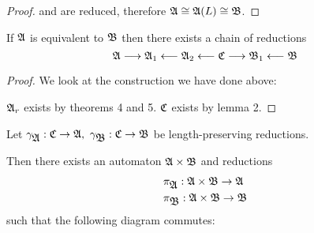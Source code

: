 \begin{proof}
 and  are reduced, therefore $\mbox{$\mathfrak{A}$} \cong \mbox{$\mathfrak{A}$}(L) \cong \mbox{$\mathfrak{B}$}$.
\end{proof}

\medskip
\begin{corollary}
If $\mbox{$\mathfrak{A}$}$ is equivalent to $\mbox{$\mathfrak{B}$}$ then there exists a chain of reductions
\[ \mbox{$\mathfrak{A}$} \longrightarrow \mbox{$\mathfrak{A}$}_1 \longleftarrow \mbox{$\mathfrak{A}$}_2 \longleftarrow \mbox{$\mathfrak{C}$}
\longrightarrow \mbox{$\mathfrak{B}$}_1 \longleftarrow \mbox{$\mathfrak{B}$} \]
\end{corollary}

\begin{proof}
We look at the construction we have done above:

\begin{center}
\end{center}

$\mbox{$\mathfrak{A}$}_r$ exists by theorems 4 and 5. $\mbox{$\mathfrak{C}$}$ exists by lemma 2.
\end{proof}

\bigskip
\begin{lemma}
Let $\gamma_{\fa{A}} : \fa{C} \to \fa{A},\ \gamma_{\fa{B}} : \fa{C} \to \fa{B}$
be length-preserving reductions.

Then there exists an automaton $\mbox{$\mathfrak{A}$} \times \mbox{$\mathfrak{B}$}$ and reductions
\begin{eqnarray*}
& \pi_{\mbox{$\mathfrak{A}$}} : \mbox{$\mathfrak{A}$} \times \mbox{$\mathfrak{B}$} \to \mbox{$\mathfrak{A}$} \\
& \pi_{\mbox{$\mathfrak{B}$}} : \mbox{$\mathfrak{A}$} \times \mbox{$\mathfrak{B}$} \to \mbox{$\mathfrak{B}$}
\end{eqnarray*}
such that the following diagram commutes:

\begin{center}
\end{center}
\end{lemma}


